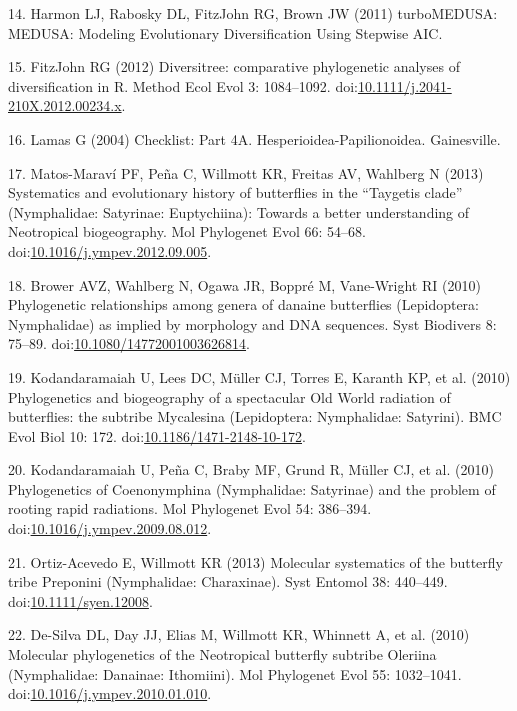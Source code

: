 \documentclass[]{article}
\begin{document}
14. Harmon LJ, Rabosky DL, {FitzJohn} RG, Brown JW (2011) turboMEDUSA:
MEDUSA: Modeling Evolutionary Diversification Using Stepwise AIC.

15. {FitzJohn} RG (2012) Diversitree: comparative phylogenetic analyses
of diversification in R. Method Ecol Evol 3: 1084--1092.
doi:\href{http://dx.doi.org/10.1111/j.2041-210X.2012.00234.x}{10.1111/j.2041-210X.2012.00234.x}.

16. Lamas G (2004) Checklist: Part 4A. Hesperioidea-Papilionoidea.
Gainesville.

17. Matos-Maraví PF, Peña C, Willmott KR, Freitas AV, Wahlberg N (2013)
Systematics and evolutionary history of butterflies in the ``Taygetis
clade'' (Nymphalidae: Satyrinae: Euptychiina): Towards a better
understanding of Neotropical biogeography. Mol Phylogenet Evol 66:
54--68.
doi:\href{http://dx.doi.org/10.1016/j.ympev.2012.09.005}{10.1016/j.ympev.2012.09.005}.

18. Brower AVZ, Wahlberg N, Ogawa JR, Boppré M, Vane-Wright RI (2010)
Phylogenetic relationships among genera of danaine butterflies
(Lepidoptera: Nymphalidae) as implied by morphology and DNA sequences.
Syst Biodivers 8: 75--89.
doi:\href{http://dx.doi.org/10.1080/14772001003626814}{10.1080/14772001003626814}.

19. Kodandaramaiah U, Lees DC, Müller CJ, Torres E, Karanth KP, et al.
(2010) Phylogenetics and biogeography of a spectacular Old World
radiation of butterflies: the subtribe Mycalesina (Lepidoptera:
Nymphalidae: Satyrini). BMC Evol Biol 10: 172.
doi:\href{http://dx.doi.org/10.1186/1471-2148-10-172}{10.1186/1471-2148-10-172}.

20. Kodandaramaiah U, Peña C, Braby MF, Grund R, Müller CJ, et al.
(2010) Phylogenetics of Coenonymphina (Nymphalidae: Satyrinae) and the
problem of rooting rapid radiations. Mol Phylogenet Evol 54: 386--394.
doi:\href{http://dx.doi.org/10.1016/j.ympev.2009.08.012}{10.1016/j.ympev.2009.08.012}.

21. Ortiz-Acevedo E, Willmott KR (2013) Molecular systematics of the
butterfly tribe Preponini (Nymphalidae: Charaxinae). Syst Entomol 38:
440--449.
doi:\href{http://dx.doi.org/10.1111/syen.12008}{10.1111/syen.12008}.

22. De-Silva DL, Day JJ, Elias M, Willmott KR, Whinnett A, et al. (2010)
Molecular phylogenetics of the Neotropical butterfly subtribe Oleriina
(Nymphalidae: Danainae: Ithomiini). Mol Phylogenet Evol 55: 1032--1041.
doi:\href{http://dx.doi.org/10.1016/j.ympev.2010.01.010}{10.1016/j.ympev.2010.01.010}.
\end{document}
